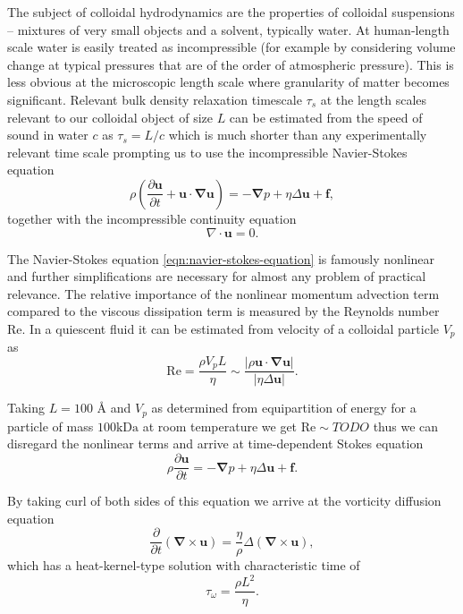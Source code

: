 \documentclass{doctoral}
\newcommand{\pd}{\partial}
\newcommand{\Reynolds}{\mathrm{Re}}
\begin{document}
The subject of colloidal hydrodynamics are the properties of colloidal suspensions -- mixtures of very small objects and a solvent, typically water.
At human-length scale water is easily treated as incompressible (for example by considering volume change at typical pressures that are of the order of atmospheric pressure).
This is less obvious at the microscopic length scale where granularity of matter becomes significant.
Relevant bulk density relaxation timescale $\tau_s$ at the length scales relevant to our colloidal object of size $L$ can be estimated from the speed of sound in water $c$ as $\tau_s = L/c$ which is much shorter than any experimentally relevant time scale prompting us to use the incompressible Navier-Stokes equation
\begin{equation}
    \rho \left( \frac{\pd \bm{u}}{\pd t} + \bm{u} \cdot \bm{\nabla u} \right) = - \bm{\nabla} p + \eta \Delta \bm{u} + \bm{f}, \label{eqn:navier-stokes-equation}
\end{equation}
together with the incompressible continuity equation
\begin{equation}
    \nabla \cdot \bm{u} = 0 \label{eqn:incompressibility}.
\end{equation}

The Navier-Stokes equation \eqref{eqn:navier-stokes-equation} is famously nonlinear and further simplifications are necessary for almost any problem of practical relevance.
The relative importance of the nonlinear momentum advection term compared to the viscous dissipation term is measured by the Reynolds number $\Reynolds$.
In a quiescent fluid it can be estimated from velocity of a colloidal particle $V_p$ as
\begin{equation}
    \Reynolds = \frac{\rho V_p L}{\eta} \sim \frac{|\rho \bm{u} \cdot \bm{\nabla}\bm{u}|}{|\eta \Delta \bm{u}|}.
    \label{eqn:reynolds-based-estimate}
\end{equation}

Taking $L = 100$ \AA{} and $V_p$ as determined from equipartition of energy for a particle of mass $100 \mathrm{k Da}$ at room temperature we get $\Reynolds \sim TODO$ thus we can disregard the nonlinear terms and arrive at time-dependent Stokes equation
\begin{equation}
    \rho \frac{\pd \bm{u}}{\pd t} = - \bm{\nabla} p + \eta \Delta \bm{u} + \bm{f}.
    \label{eqn:time-dependent-stokes-equation}
\end{equation}

By taking curl of both sides of this equation we arrive at the vorticity diffusion equation
\begin{equation}
    \frac{\pd}{\pd t} \left( \bm{\nabla} \times \bm{u} \right) = \frac{\eta}{\rho} \Delta \left( \bm{\nabla} \times \bm{u} \right), \label{eqn:vorticity-diffusion}
\end{equation}
which has a heat-kernel-type solution with characteristic time of
\begin{equation}
    \tau_\omega = \frac{\rho L^2}{\eta}.
    \label{eqn:vorticity-timescale}
\end{equation}
\end{document}
